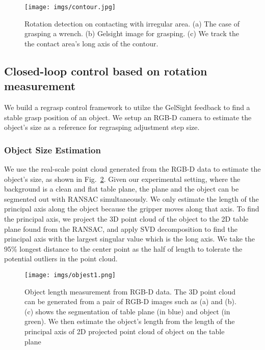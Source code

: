 \begin{figure}[t]
    \centering
    \texttt{[image: imgs/contour.jpg]}
    \caption{Rotation detection on contacting with irregular area. (a) The case of grasping a wrench. (b) Gelsight image for grasping. (c) We track the the contact area's long axis of the contour.}
    \label{fig:contour}
    \vspace{-2mm}
\end{figure}

\subsection{Closed-loop control based on rotation measurement}

We build a regrasp control framework to utilze the GelSight feedback to find a stable grasp position of an object. We setup an RGB-D camera to estimate the object's size as a reference for regrasping adjustment step size.

\subsubsection{Object Size Estimation}

We use the real-scale point cloud generated from the RGB-D data to estimate the object's size, as shown in Fig.~\ref{fig:obj}. Given our experimental setting, where the background is a clean and flat table plane, the plane and the object can be segmented out with RANSAC simultaneously. We only estimate the length of the principal axis along the object because the gripper moves along that axis. To find the principal axis, we project the 3D point cloud of the object to the 2D table plane found from the RANSAC, and apply SVD decomposition to find the principal axis with the largest singular value which is the long axis. We take the 95\% longest distance to the center point as the half of length to tolerate the potential outliers in the point cloud.
\begin{figure}[t]
    \centering
    \texttt{[image: imgs/objest1.png]}
    \caption{Object length measurement from RGB-D data. The 3D point cloud can be generated from a pair of RGB-D images such as (a) and (b). (c) shows the segmentation of table plane (in blue) and object (in green). We then estimate the object's length from the length of the principal axis of 2D projected point cloud of object on the table plane}
    \label{fig:obj}
    \vspace{-2mm}
\end{figure}
